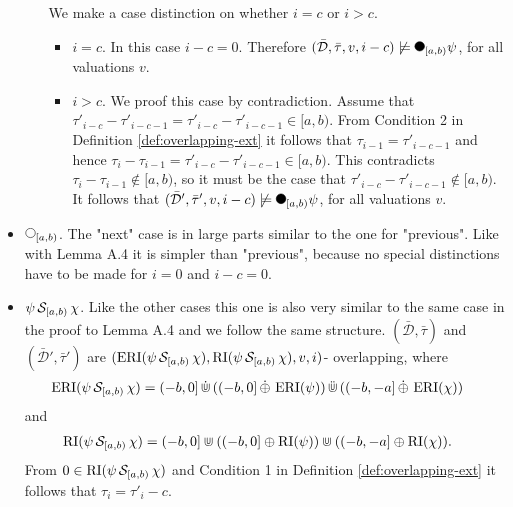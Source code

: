 \begin{itemize}
\begin{itemize}
                We make a case distinction on whether $i=c$ or $i>c$.
                \begin{itemize}
                    \item
                        $i=c$.
                        In this case $i-c = 0$.
                        Therefore $(\bar{\mathcal{D}}, \bar{\tau}, v, i-c) \not\models \Previous{[a,b)} \psi$, for all valuations $v$.
                    \item
                        $i>c$.
                        We proof this case by contradiction.
                        Assume that $\tau'_{i-c} - \tau'_{i-c-1} = \tau'_{i-c} - \tau'_{i-c-1} \in [a,b)$.
                        From Condition 2 in Definition \ref{def:overlapping-ext} it follows that $\tau_{i-1} = \tau'_{i-c-1}$ and hence $\tau_i - \tau_{i-1} = \tau'_{i-c} - \tau'_{i-c-1} \in [a,b)$.
                        This contradicts $\tau_i - \tau_{i-1} \not\in [a,b)$, so it must be the case that $\tau'_{i-c} - \tau'_{i-c-1} \not\in [a,b)$.
                        It follows that $(\bar{\mathcal{D}}', \bar{\tau}', v, i-c) \not\models \Previous{[a,b)} \psi$, for all valuations $v$.
                \end{itemize}
        \end{itemize}
    \item
        $\Next{[a,b)}$.
        The "next" case is in large parts similar to the one for "previous".
        Like with Lemma A.4 \cite{Basin2016} it is simpler than "previous", because no special distinctions have to be made for $i=0$ and $i-c=0$.
    \item
        $\psi \,\mathcal{S}_{[a,b)}\, \chi$.
        Like the other cases this one is also very similar to the same case in the proof to Lemma A.4 \cite{Basin2016} and we follow the same structure.
        $(\bar{\mathcal{D}},\bar{\tau})$ and $(\bar{\mathcal{D}}',\bar{\tau}')$ are $(\operatorname{ERI}(\psi \,\mathcal{S}_{[a,b)}\, \chi), \operatorname{RI}(\psi \,\mathcal{S}_{[a,b)}\, \chi), v, i)$- overlapping, where
        \begin{align*}
            \operatorname{ERI}(\psi \,\mathcal{S}_{[a,b)}\, \chi)
            &= (-b,0] \,\dot{\Cup}\, ((-b,0] \,\dot{\oplus}\, \operatorname{ERI}(\psi)) \,\ddot{\Cup}\, ((-b,-a] \,\dot{\oplus}\, \operatorname{ERI}(\chi))
        \end{align*}
        and
        \begin{align*}
            \operatorname{RI}(\psi \,\mathcal{S}_{[a,b)}\, \chi)
            &= (-b,0] \Cup ((-b,0] \oplus \operatorname{RI}(\psi)) \Cup ((-b,-a] \oplus \operatorname{RI}(\chi)).
        \end{align*}
        From $0 \in \operatorname{RI}(\psi \,\mathcal{S}_{[a,b)}\, \chi)$ and Condition 1 in Definition \ref{def:overlapping-ext} it follows that $\tau_i = \tau'_i-c$.


\end{itemize}
